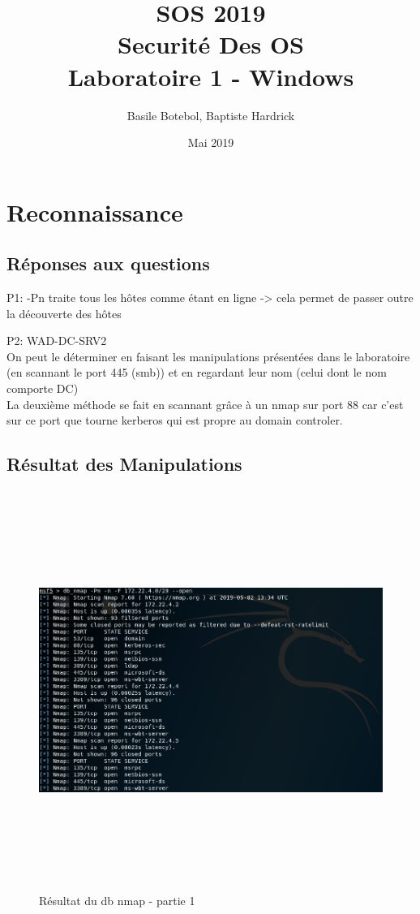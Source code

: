 \documentclass[12pt]{report} %
\title{\textbf{SOS 2019\\Securité Des OS\\Laboratoire 1 - Windows}} %
\author{Basile Botebol, Baptiste Hardrick}
\date{Mai 2019} %
\begin{document}
\maketitle

\section*{Reconnaissance}

\subsection*{Réponses aux questions}
\par P1: -Pn traite tous les hôtes comme étant en ligne -> cela permet de passer outre la découverte des hôtes

\par P2: WAD-DC-SRV2\\
On peut le déterminer en faisant les manipulations présentées dans le laboratoire (en scannant le port 445 (smb)) 
et en regardant leur nom (celui dont le nom comporte DC)\\
La deuxième méthode se fait en scannant grâce à un nmap sur port 88 car c'est sur ce port que tourne kerberos qui est 
propre au domain controler.


\subsection*{Résultat des Manipulations}

\begin{figure}[!h]
	\includegraphics[width=17cm, height=13cm]{db_nmap_3_1_a.PNG}
	\caption*{Résultat du db nmap - partie 1}
\end{figure}
\end{document}

